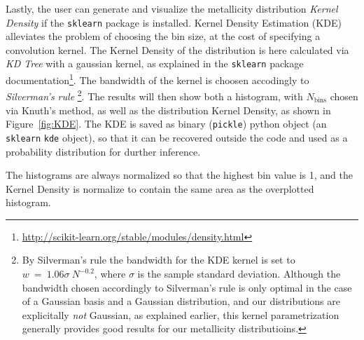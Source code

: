 \documentclass{emulateapj}
\begin{document}
Lastly, the user can generate and visualize the metallicity distribution \emph{Kernel Density} if the \verb=sklearn= package is installed. Kernel Density Estimation (KDE) alleviates the problem of choosing the bin size, at the cost of specifying a convolution kernel. The Kernel Density of the distribution is here calculated via  \emph{KD Tree} with a gaussian kernel, as explained in the \verb=sklearn= package documentation\footnote{\url{http://scikit-learn.org/stable/modules/density.html}}. The bandwidth of the kernel is choosen accodingly to \emph{Silverman's rule} \citep{silverman86}\footnote{By Silverman's rule the bandwidth for the KDE kernel is set to $w~=~1.06\sigma~N^{-0.2}$, where $\sigma$ is the sample standard deviation. Although the bandwidth chosen accordingly to Silverman's rule is only optimal in the case of a Gaussian basis and a Gaussian distribution, and our distributions are explicitally \emph{not} Gaussian, as explained earlier, this kernel parametrization generally provides good results for our metallicity distributioins.}. The results will then show both a histogram, with $N_\mathrm{bins}$ chosen via Knuth's method, as well as the distribution Kernel Density, as shown in Figure~\ref{fig:KDE}. The KDE is saved as binary (\verb=pickle=) python object (an \verb=sklearn= \verb=kde= object), so that it can be recovered outside the code and used as a probability distribution for durther inference.

The histograms are always normalized so that the highest bin value is 1, and the  Kernel Density is normalize to contain the same area as the overplotted histogram. %
\end{document}
